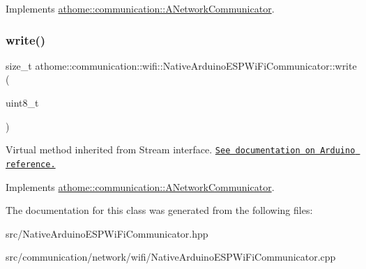 Implements \mbox{\hyperlink{classathome_1_1communication_1_1_a_network_communicator_a88d3c4366daf48865ab48b22eb62d610}{athome\+::communication\+::\+A\+Network\+Communicator}}.

\mbox{\label{classathome_1_1communication_1_1wifi_1_1_native_arduino_e_s_p_wi_fi_communicator_a99fab41ad5275649efafa0a776a0348f}} 
\subsubsection{\texorpdfstring{write()}{write()}}
{\footnotesize\ttfamily size\+\_\+t athome\+::communication\+::wifi\+::\+Native\+Arduino\+E\+S\+P\+Wi\+Fi\+Communicator\+::write (\begin{DoxyParamCaption}\item[{uint8\+\_\+t}]{ }\end{DoxyParamCaption})\hspace{0.3cm}{\ttfamily [virtual]}}

Virtual method inherited from Stream interface. \href{https://www.arduino.cc/en/Serial/Write}{\tt See documentation on Arduino reference.} 

Implements \mbox{\hyperlink{classathome_1_1communication_1_1_a_network_communicator_a87adf68359a4ec5b0a38bea529ebf732}{athome\+::communication\+::\+A\+Network\+Communicator}}.



The documentation for this class was generated from the following files\+:\begin{DoxyCompactItemize}
\item 
src/Native\+Arduino\+E\+S\+P\+Wi\+Fi\+Communicator.\+hpp\item 
src/communication/network/wifi/Native\+Arduino\+E\+S\+P\+Wi\+Fi\+Communicator.\+cpp\end{DoxyCompactItemize}
